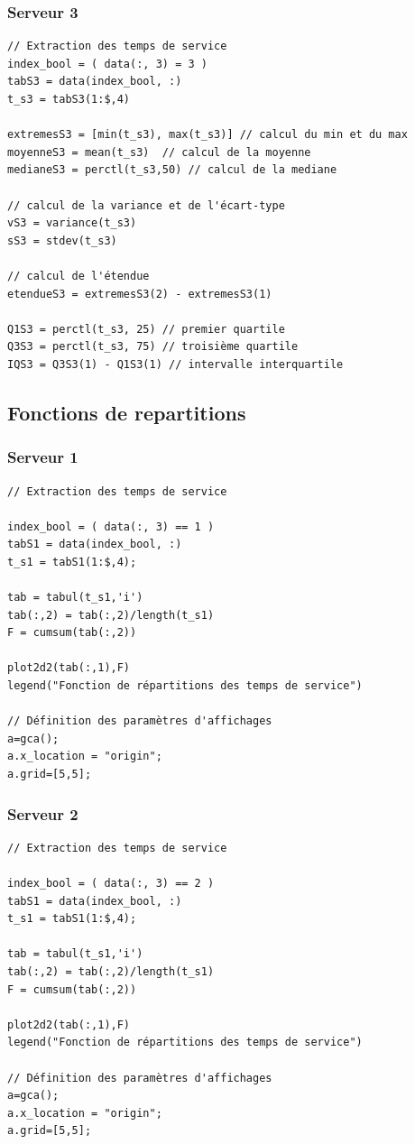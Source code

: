 \documentclass{article}
\begin{document}
\subsubsection{Serveur 3}
\begin{verbatim}
// Extraction des temps de service
index_bool = ( data(:, 3) = 3 )
tabS3 = data(index_bool, :)
t_s3 = tabS3(1:$,4)

extremesS3 = [min(t_s3), max(t_s3)] // calcul du min et du max
moyenneS3 = mean(t_s3)  // calcul de la moyenne
medianeS3 = perctl(t_s3,50) // calcul de la mediane

// calcul de la variance et de l'écart-type
vS3 = variance(t_s3)
sS3 = stdev(t_s3)

// calcul de l'étendue
etendueS3 = extremesS3(2) - extremesS3(1)

Q1S3 = perctl(t_s3, 25) // premier quartile
Q3S3 = perctl(t_s3, 75) // troisième quartile
IQS3 = Q3S3(1) - Q1S3(1) // intervalle interquartile
\end{verbatim}

\subsection{Fonctions de repartitions}

\subsubsection{Serveur 1}
\begin{verbatim}
// Extraction des temps de service

index_bool = ( data(:, 3) == 1 )
tabS1 = data(index_bool, :)
t_s1 = tabS1(1:$,4);

tab = tabul(t_s1,'i')
tab(:,2) = tab(:,2)/length(t_s1)
F = cumsum(tab(:,2))

plot2d2(tab(:,1),F)
legend("Fonction de répartitions des temps de service")

// Définition des paramètres d'affichages
a=gca();
a.x_location = "origin";
a.grid=[5,5];
\end{verbatim}

\subsubsection{Serveur 2}
\begin{verbatim}
// Extraction des temps de service

index_bool = ( data(:, 3) == 2 )
tabS1 = data(index_bool, :)
t_s1 = tabS1(1:$,4);

tab = tabul(t_s1,'i')
tab(:,2) = tab(:,2)/length(t_s1)
F = cumsum(tab(:,2))

plot2d2(tab(:,1),F)
legend("Fonction de répartitions des temps de service")

// Définition des paramètres d'affichages
a=gca();
a.x_location = "origin";
a.grid=[5,5];
\end{verbatim}
\end{document}
